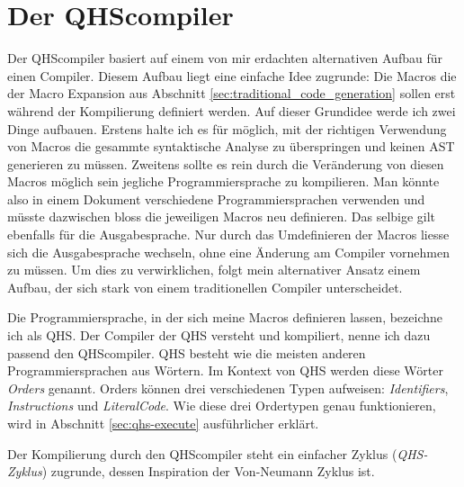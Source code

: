 \chapter{Der QHScompiler} \label{cha:4-QHS_Compiler}
Der QHScompiler basiert auf einem von mir erdachten alternativen Aufbau für einen Compiler. Diesem Aufbau liegt eine einfache Idee zugrunde:
Die Macros die der Macro Expansion aus Abschnitt \ref{sec:traditional_code_generation} sollen erst während der Kompilierung definiert werden. 
Auf dieser Grundidee werde ich zwei Dinge aufbauen. Erstens halte ich es für möglich, mit der richtigen Verwendung von Macros die gesammte syntaktische Analyse zu überspringen und keinen AST generieren zu müssen.
Zweitens sollte es rein durch die Veränderung von diesen Macros möglich sein jegliche Programmiersprache zu kompilieren. Man könnte also in einem Dokument verschiedene Programmiersprachen verwenden und
müsste dazwischen bloss die jeweiligen Macros neu definieren. Das selbige gilt ebenfalls für die Ausgabesprache.
Nur durch das Umdefinieren der Macros liesse sich die Ausgabesprache wechseln, ohne eine Änderung am Compiler vornehmen zu müssen.
Um dies zu verwirklichen, folgt mein alternativer Ansatz einem Aufbau, der sich stark von einem traditionellen Compiler unterscheidet.

Die Programmiersprache, in der sich meine Macros definieren lassen, bezeichne ich als QHS. Der Compiler der QHS versteht und kompiliert, nenne ich dazu passend den QHScompiler.
QHS besteht wie die meisten anderen Programmiersprachen aus Wörtern. Im Kontext von QHS werden diese Wörter \textit{Orders} genannt.
Orders können drei verschiedenen Typen aufweisen: \textit{Identifiers}, \textit{Instructions} und \textit{LiteralCode}.
Wie diese drei Ordertypen genau funktionieren, wird in Abschnitt \ref{sec:qhs-execute} ausführlicher erklärt.

Der Kompilierung durch den QHScompiler steht ein einfacher Zyklus (\textit{QHS-Zyklus}) zugrunde, dessen Inspiration der Von-Neumann Zyklus ist.

